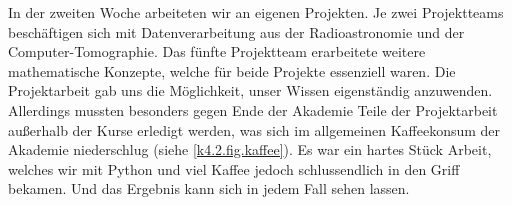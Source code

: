 In der zweiten Woche arbeiteten wir an eigenen Projekten. Je zwei Projektteams beschäftigen sich mit Datenverarbeitung aus der Radioastronomie und der Computer-Tomographie. Das fünfte Projektteam erarbeitete weitere mathematische Konzepte, welche für beide Projekte essenziell waren. Die Projektarbeit gab uns die Möglichkeit, unser Wissen eigenständig anzuwenden. Allerdings mussten besonders gegen Ende der Akademie Teile der Projektarbeit außerhalb der Kurse erledigt werden, was sich im allgemeinen Kaffeekonsum der Akademie niederschlug (siehe \cref{k4.2.fig.kaffee}).
Es war ein hartes Stück Arbeit, welches wir mit Python und viel Kaffee jedoch schlussendlich in den Griff bekamen. Und das Ergebnis kann sich in jedem Fall sehen lassen.
